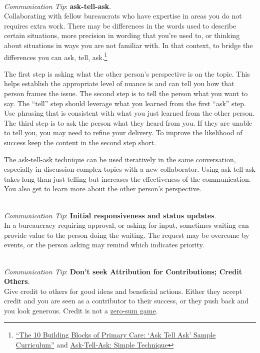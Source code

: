 \ \\
\textit{Communication Tip}: \textbf{ask-tell-ask}.\\
Collaborating with fellow bureaucrats who have expertise in areas you do not requires extra work. There may be differences in the words used to describe certain situations, more precision in wording that you're used to, or thinking about situations in ways you are not familiar with. In that context, to bridge the differences you can ask, tell, ask.\footnote{\href{https://cepc.ucsf.edu/sites/cepc.ucsf.edu/files/Curriculum_sample_14-0602.pdf}{``The 10 Building Blocks of Primary Care: `Ask Tell Ask' Sample Curriculum''} and \href{https://www.the-hospitalist.org/hospitalist/article/125126/qi-initiatives/ask-tell-ask-simple-technique-can-help-hospitalists}{Ask-Tell-Ask: Simple Technique}} 

The first step is asking what the other person's perspective is on the topic. This helps establish the appropriate level of nuance is and can tell you how that person frames the issue. The second step is to tell the person what you want to say. The ``tell'' step should leverage what you learned from the first ``ask'' step. Use phrasing that is consistent with what you just learned from the other person. The third step is to ask the person what they heard from you. If they are unable to tell you, you may need to refine your delivery. To improve the likelihood of success keep the content in the second step short. 

The ask-tell-ask technique can be used iteratively in the same conversation, especially in discussion complex topics with a new collaborator. 
Using ask-tell-ask takes long than just telling but increases the effectiveness of the communication. You also get to learn more about the other person's perspective. 

\ \\
\textit{Communication Tip}: \textbf{Initial responsiveness and status updates}.\\
In a bureaucracy requiring approval, or asking for input, sometimes waiting can provide value to the person doing the waiting. The request may be overcome by events, or the person asking may remind which indicates priority.

\ \\
\textit{Communication Tip}: \textbf{Don't seek Attribution for Contributions; Credit Others\label{sec:credit-others}}.\\
Give credit to others for good ideas and beneficial actions. Either they accept credit and you are seen as a contributor to their success, or they push back and you look generous. Credit is not a \href{https://en.wikipedia.org/wiki/Zero-sum_game}{zero-sum game}.

